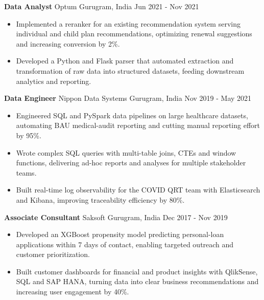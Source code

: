 \documentclass[10pt,a4paper]{article}
\newcommand{\role}[4]{\textbf{#1} \textbar{} #2 \hfill #3 \textbar{} #4\par}
\begin{document}
\vspace{3pt}
\role{Data Analyst}{Optum}{Gurugram, India}{Jun 2021 - Nov 2021}
\begin{itemize}
  \item Implemented a reranker for an existing recommendation system serving individual and child plan recommendations, optimizing renewal suggestions and increasing conversion by 2\%.
  \item Developed a Python and Flask parser that automated extraction and transformation of raw data into structured datasets, feeding downstream analytics and reporting.
\end{itemize}
\vspace{3pt}
\role{Data Engineer}{Nippon Data Systems}{Gurugram, India}{Nov 2019 - May 2021}
\begin{itemize}
  \item Engineered SQL and PySpark data pipelines on large healthcare datasets, automating BAU medical-audit reporting and cutting manual reporting effort by 95\%.
  \item Wrote complex SQL queries with multi-table joins, CTEs and window functions, delivering ad-hoc reports and analyses for multiple stakeholder teams.
  \item Built real-time log observability for the COVID QRT team with Elasticsearch and Kibana, improving traceability efficiency by 80\%.
\end{itemize}
\vspace{3pt}
\role{Associate Consultant}{Saksoft}{Gurugram, India}{Dec 2017 - Nov 2019}
\begin{itemize}
  \item Developed an XGBoost propensity model predicting personal-loan applications within 7 days of contact, enabling targeted outreach and customer prioritization.
  \item Built customer dashboards for financial and product insights with QlikSense, SQL and SAP HANA, turning data into clear business recommendations and increasing user engagement by 40\%.
\end{itemize}
\end{document}
